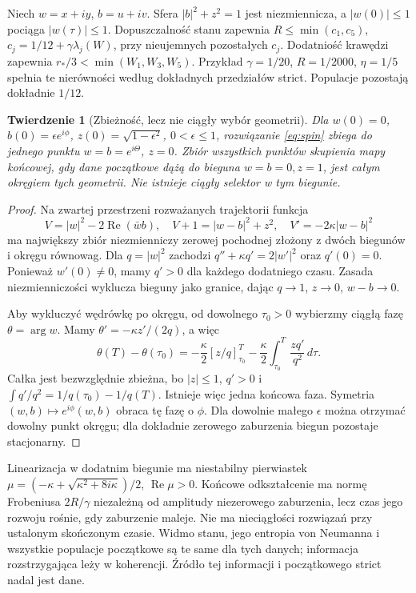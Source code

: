 \documentclass[11pt,a4paper]{article}
\newtheorem{theorem}{Twierdzenie}
\newcommand{\Rea}{\operatorname{Re}}
\begin{document}
Niech $w=x+iy$, $b=u+iv$. Sfera $|b|^2+z^2=1$ jest niezmiennicza,
a $|w(0)|\le1$ pociąga $|w(\tau)|\le1$.
Dopuszczalność stanu zapewnia $R\le\min(c_1,c_5)$,
$c_j=1/12+\gamma\lambda_j(W)$, przy nieujemnych pozostałych $c_j$.
Dodatniość krawędzi zapewnia
$r_*/3<\min(W_1,W_3,W_5)$. Przykład
$\gamma=1/20$, $R=1/2000$, $\eta=1/5$ spełnia te nierówności według
dokładnych przedziałów strict. Populacje pozostają dokładnie $1/12$.

\begin{theorem}[Zbieżność, lecz nie ciągły wybór geometrii]
Dla $w(0)=0$, $b(0)=\epsilon e^{i\phi}$,
$z(0)=\sqrt{1-\epsilon^2}$, $0<\epsilon\le1$, rozwiązanie
\eqref{eq:spin} zbiega do jednego punktu
$w=b=e^{i\Theta}$, $z=0$. Zbiór wszystkich punktów skupienia mapy
końcowej, gdy dane początkowe dążą do bieguna $w=b=0,z=1$, jest całym
okręgiem tych geometrii. Nie istnieje ciągły selektor w tym biegunie.
\end{theorem}

\begin{proof}
Na zwartej przestrzeni rozważanych trajektorii funkcja
\[
 V=|w|^2-2\Rea(\bar wb),\quad
 V+1=|w-b|^2+z^2,\quad V'=-2\kappa|w-b|^2
\]
ma największy zbiór niezmienniczy zerowej pochodnej złożony z dwóch
biegunów i okręgu równowag. Dla $q=|w|^2$ zachodzi
$q''+\kappa q'=2|w'|^2$ oraz $q'(0)=0$.
Ponieważ $w'(0)\ne0$, mamy $q'>0$ dla każdego dodatniego czasu.
Zasada niezmienniczości wyklucza bieguny jako granice, dając
$q\to1$, $z\to0$, $w-b\to0$.

Aby wykluczyć wędrówkę po okręgu, od dowolnego $\tau_0>0$ wybierzmy
ciągłą fazę $\theta=\arg w$. Mamy $\theta'=-\kappa z'/(2q)$, a więc
\[
 \theta(T)-\theta(\tau_0)
 =-\frac\kappa2[z/q]_{\tau_0}^{T}
  -\frac\kappa2\int_{\tau_0}^{T}\frac{zq'}{q^2}\,d\tau.
\]
Całka jest bezwzględnie zbieżna, bo $|z|\le1$, $q'>0$ i
$\int q'/q^2=1/q(\tau_0)-1/q(T)$. Istnieje więc jedna końcowa faza.
Symetria $(w,b)\mapsto e^{i\phi}(w,b)$ obraca tę fazę o $\phi$.
Dla dowolnie małego $\epsilon$ można otrzymać dowolny punkt okręgu;
dla dokładnie zerowego zaburzenia biegun pozostaje stacjonarny.
\end{proof}

Linearizacja w dodatnim biegunie ma niestabilny pierwiastek
$\mu=(-\kappa+\sqrt{\kappa^2+8i\kappa})/2$, $\Rea\mu>0$.
Końcowe odkształcenie ma normę Frobeniusa $2R/\gamma$ niezależną od
amplitudy niezerowego zaburzenia, lecz czas jego rozwoju rośnie, gdy
zaburzenie maleje. Nie ma nieciągłości rozwiązań przy ustalonym skończonym
czasie. Widmo stanu, jego entropia von Neumanna i wszystkie populacje
początkowe są te same dla tych danych; informacja rozstrzygająca leży
w koherencji. Źródło tej informacji i początkowego strict nadal jest dane.
\end{document}
